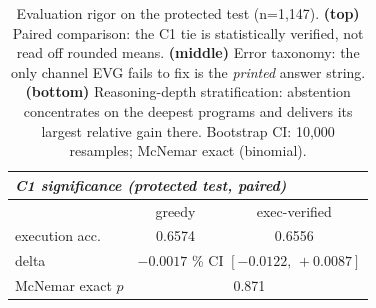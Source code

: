 \documentclass[conference]{IEEEtran}
\begin{document}
\begin{table}[t]
\centering
\caption{\label{tab:rigor} Evaluation rigor on the protected test (n=1,147). \textbf{(top)}
Paired comparison: the C1 tie is statistically verified, not read off rounded means.
\textbf{(middle)} Error taxonomy: the only channel EVG fails to fix is the \emph{printed}
answer string. \textbf{(bottom)} Reasoning-depth stratification: abstention concentrates on
the deepest programs and delivers its largest relative gain there. Bootstrap CI: 10{,}000
resamples; McNemar exact (binomial).}
\small
\begin{tabular}{lcc}
\toprule
\multicolumn{3}{l}{\emph{C1 significance (protected test, paired)}}\\
\toprule
 & greedy & exec-verified\\
\midrule
execution acc. & 0.6574 & 0.6556\\
delta & \multicolumn{2}{c}{$-0.0017$ \quad 95\% CI $[-0.0122,\,+0.0087]$}\\
McNemar exact $p$ & \multicolumn{2}{c}{0.871}\\
\bottomrule
\end{tabular}
\vspace{0.6em}
\vspace{0.6em}
\end{table}
\end{document}
